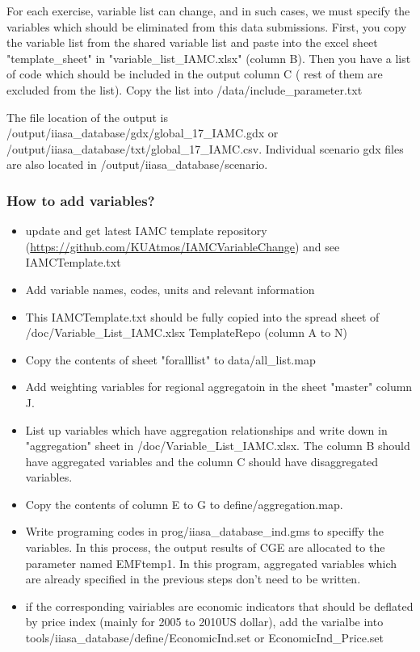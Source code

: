 \documentclass[10pt,a4paper,titlepage,dvipdfmx]{book}
\begin{document}
For each exercise, variable list can change, and in such cases, we must specify the variables which should be eliminated from this data submissions. 
First, you copy the variable list from the shared variable list and paste into the excel sheet "template\_sheet" in "variable\_list\_IAMC.xlsx" (column B). 
Then you have a list of code which should be included in the output column C ( rest of them are excluded from the list). 
Copy the list into /data/include\_parameter.txt

  The file location of the output is /output/iiasa\_database/gdx/global\_17\_IAMC.gdx or /output/iiasa\_database/txt/global\_17\_IAMC.csv.
Individual scenario gdx files are also located in /output/iiasa\_database/scenario.

\subsubsection{\label{subsubsec:HowtoAddVar}How to add variables?}

\begin{itemize}
\item update and get latest IAMC template repository (\url{https://github.com/KUAtmos/IAMCVariableChange}) and see IAMCTemplate.txt
\item Add variable names, codes, units and relevant information
\item	This IAMCTemplate.txt should be fully copied into the spread sheet of /doc/Variable\_List\_IAMC.xlsx TemplateRepo (column A to N)
\item	Copy the contents of sheet "foralllist" to data/all\_list.map
\item	Add weighting variables for regional aggregatoin in the sheet "master" column J.
\item	List up variables which have aggregation relationships and write down in "aggregation" sheet in /doc/Variable\_List\_IAMC.xlsx. The column B should have aggregated variables and the column C should have disaggregated variables. 
\item	Copy the contents of column E to G to define/aggregation.map.
\item	Write programing codes in prog/iiasa\_database\_ind.gms to speciffy the variables. In this process, the output results of CGE are allocated to the parameter named EMFtemp1. In this program, aggregated variables which are already specified in the previous steps don't need to be written.
\item	if the corresponding vairiables are economic indicators that should be deflated by price index (mainly for 2005 to 2010US dollar), 
add the varialbe into tools/iiasa\_database/define/EconomicInd.set or EconomicInd\_Price.set
\end{itemize}
\end{document}

